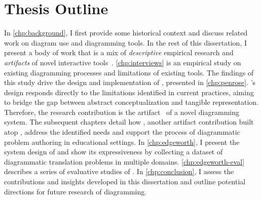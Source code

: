 




\section{Thesis Outline}



In \cref{chp:background}, I first provide some historical context and discuss related work on diagram use and diagramming tools. In the rest of this dissertation, I present a body of work that is a mix of \textit{descriptive} empirical research and \textit{artifacts} of novel interactive tools~\cite{wobbrock_research_2016}.  \cref{chp:interviews} is an empirical study on existing diagramming processes and limitations of existing tools.
The findings of this study drive the design and implementation of \Penrose, presented in \cref{chp:penrose}. \Penrose's design responds directly to the limitations identified in current practices, aiming to bridge the gap between abstract conceptualization and tangible representation. Therefore, the research contribution is the artifact~\cite{wobbrock_research_2016} of a novel diagramming system. The subsequent chapters detail how \Edgeworth, another artifact contribution built atop \Penrose, address the identified needs and support the process of diagrammatic problem authoring in educational settings. In \cref{chp:edgeworth}, I present the system design of \Edgeworth and show its expressiveness by collecting a dataset of diagrammatic translation problems in multiple domains. \cref{chp:edgeworth-eval} describes a series of evaluative studies of \Edgeworth. In \cref{chp:conclusion}, I assess the contributions and insights developed in this dissertation and outline potential directions for future research of diagramming.

